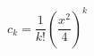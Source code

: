 \documentclass[12pt]{article}
\begin{document}
\begin{displaymath}
c_k = \frac{1}{k!}\left(\frac{x^2}{4}\right)^k
\end{displaymath}
\end{document}
